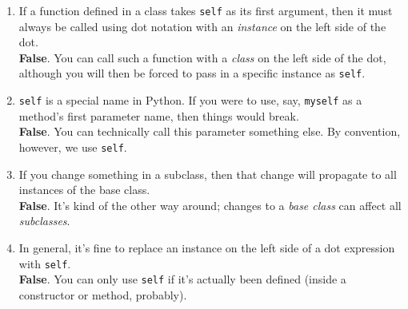 \documentclass[twoside]{article}
\newcommand{\solution}[1]{{\color{red}#1}}
\begin{document}
\begin{enumerate}
\begin{enumerate}
\item If a function defined in a class takes \texttt{self} as its first argument, then it must always be called using dot notation with an \textit{instance} on the left side of the dot.\\

\solution{\textbf{False}. You can call such a function with a \textit{class} on the left side of the dot, although you will then be forced to pass in a specific instance as \texttt{self}.}\\

\item \texttt{self} is a special name in Python. If you were to use, say, \texttt{myself} as a method's first parameter name, then things would break.\\

\solution{\textbf{False}. You can technically call this parameter something else. By convention, however, we use \texttt{self}.}\\

\item If you change something in a subclass, then that change will propagate to all instances of the base class.\\

\solution{\textbf{False}. It's kind of the other way around; changes to a \textit{base class} can affect all \textit{subclasses}.}\\

\item In general, it's fine to replace an instance on the left side of a dot expression with \texttt{self}.\\

\solution{\textbf{False}. You can only use \texttt{self} if it's actually been defined (inside a constructor or method, probably).}

\end{enumerate}

\end{enumerate}
\end{document}
